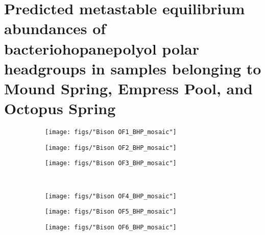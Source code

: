 \chapter{Predicted metastable equilibrium abundances of bacteriohopanepolyol polar headgroups in samples belonging to Mound Spring, Empress Pool, and Octopus Spring}

\singlespace

\begin{figure}[h]
\centering
    \begin{subfigure}[b]{\linewidth}
        \texttt{[image: figs/"Bison OF1\_BHP\_mosaic"]}
        \label{fig:BP1_degform}
    \end{subfigure}
    \begin{subfigure}[b]{\linewidth}
        \texttt{[image: figs/"Bison OF2\_BHP\_mosaic"]}
        \label{fig:BP2_degform}
    \end{subfigure}
\end{figure}

\newpage

\begin{figure}[h]\ContinuedFloat
    \begin{subfigure}[b]{\linewidth}
        \texttt{[image: figs/"Bison OF3\_BHP\_mosaic"]}
        \label{fig:BP3_degform}
    \end{subfigure}\\[-4ex]
    \begin{subfigure}[b]{\linewidth}
    	\texttt{[image: figs/"Bison OF4\_BHP\_mosaic"]}
        \label{fig:BP4_degform}
    \end{subfigure}
\end{figure}

\newpage

\begin{figure}[h]\ContinuedFloat
    \begin{subfigure}[b]{\linewidth}
        \texttt{[image: figs/"Bison OF5\_BHP\_mosaic"]}
        \label{fig:BP5_degform}
    \end{subfigure}
    \begin{subfigure}[b]{\linewidth}
        \texttt{[image: figs/"Bison OF6\_BHP\_mosaic"]}
        \label{fig:BP6_degform}
    \end{subfigure}\\[-4ex]
\end{figure}

\newpage

